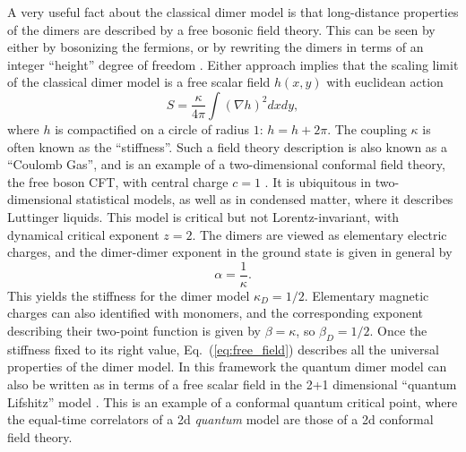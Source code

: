 \documentclass[11pt]{iopart}
\begin{document}
A very useful fact about the classical dimer model is that long-distance properties of the dimers are described by a free bosonic field theory. This can be seen by either by bosonizing the fermions, or by rewriting the dimers in terms of an integer ``height'' degree of freedom \cite{Heights_1,Heights_2,Henley}. Either approach implies that the scaling limit of the classical dimer model is a free scalar field $h(x,y)$ with euclidean action
 \begin{equation}\label{eq:free_field}
  S=\frac{\kappa}{4\pi}\int \left(\nabla h\right)^2 dx dy,
 \end{equation}
 where $h$ is compactified on a circle of radius $1$: $h=h+2\pi$. The coupling $\kappa$ is often known as the ``stiffness''. Such a field theory description is also known as a ``Coulomb Gas'', and is an example of a two-dimensional conformal field theory, the free boson CFT, with central charge $c=1$ \cite{Nienhuis,Ginsparg}. It is ubiquitous in two-dimensional statistical models, as well as in condensed matter, where it describes Luttinger liquids.   This model is critical but not Lorentz-invariant, with dynamical critical exponent $z=2$.  The dimers are viewed as elementary electric charges, and the dimer-dimer exponent in the ground state is given in general by
\begin{equation}
 \alpha=\frac{1}{\kappa}.
\end{equation}
This yields the stiffness for the dimer model $\kappa_D=1/2$. Elementary magnetic charges can also identified with monomers, and the corresponding exponent describing their two-point function is given by $\beta=\kappa$, so $\beta_D=1/2$.
Once the stiffness fixed to its right value, Eq.~(\ref{eq:free_field}) describes all the universal properties of the dimer model.
In this framework the quantum dimer model can also be written as in terms of a free scalar field in the 2+1 dimensional ``quantum Lifshitz'' model \cite{Henley,Fradkin_dimers}. This is an example of a conformal quantum critical point, where the equal-time correlators of a 2d {\em quantum} model are those of a 2d conformal field theory.
\end{document}
